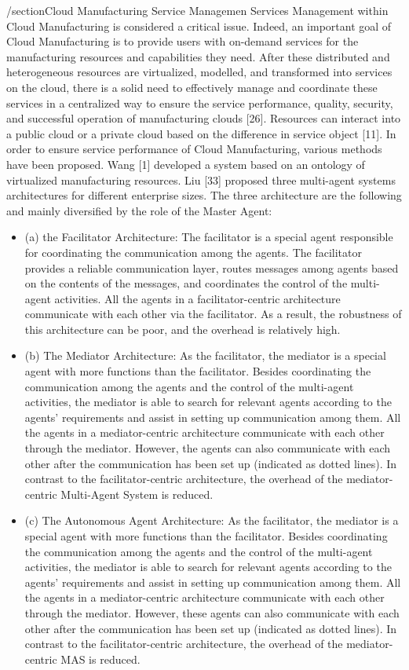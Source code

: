 /section{Cloud Manufacturing Service Managemen}
Services Management within Cloud Manufacturing is considered a critical issue. Indeed, an important goal of Cloud Manufacturing is to provide users with on-demand services for the manufacturing resources and capabilities they need. After these distributed and heterogeneous resources are virtualized, modelled, and transformed into services on the cloud, there is a solid need to effectively manage and coordinate these services in a centralized way to ensure the service performance, quality, security, and successful operation of manufacturing clouds [26]. Resources can interact into a public cloud or a private cloud based on the difference in service object [11]. In order to ensure service performance of Cloud Manufacturing, various methods have been proposed. Wang [1] developed a system based on an ontology of virtualized manufacturing resources. Liu [33] proposed three multi-agent systems architectures for different enterprise sizes. The three architecture are the following and mainly diversified by the role of the Master Agent:
\begin{itemize}
    \item (a) the Facilitator Architecture: The facilitator is a special agent responsible for coordinating the communication among the agents. The facilitator provides a reliable communication layer, routes messages among agents based on the contents of the messages, and coordinates the control of the multi-agent activities. All the agents in a facilitator-centric architecture communicate with each other via the facilitator. As a result, the robustness of this architecture can be poor, and the overhead is relatively high.
    \item (b) The Mediator Architecture: As the facilitator, the mediator is a special agent with more functions than the facilitator. Besides coordinating the communication among the agents and the control of the multi-agent activities, the mediator is able to search for relevant agents according to the agents’ requirements and assist in setting up communication among them. All the agents in a mediator-centric architecture communicate with each other through the mediator. However, the agents can also communicate with each other after the communication has been set up (indicated as dotted lines). In contrast to the facilitator-centric architecture, the overhead of the mediator-centric Multi-Agent System is reduced.
    \item (c) The Autonomous Agent Architecture: As the facilitator, the mediator is a special agent with more functions than the facilitator. Besides coordinating the communication among the agents and the control of the multi-agent activities, the mediator is able to search for relevant agents according to the agents’ requirements and assist in setting up communication among them. All the agents in a mediator-centric architecture communicate with each other through the mediator. However, these agents can also communicate with each other after the communication has been set up (indicated as dotted lines). In contrast to the facilitator-centric architecture, the overhead of the mediator- centric MAS is reduced.
\end{itemize}


